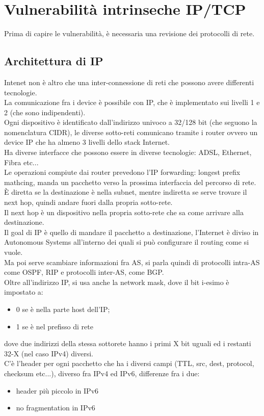 \documentclass[12pt, oneside]{extbook} %
\begin{document}
\chapter*{Vulnerabilità intrinseche IP/TCP}
Prima di capire le vulnerabilità, è necessaria una revisione dei protocolli di rete.
\section{Architettura di IP}
Intenet non è altro che una inter-connessione di reti che possono avere differenti tecnologie.
\\La comunicazione fra i device è possibile con IP, che è implementato sui livelli 1 e 2 (che sono indipendenti). 
\\Ogni dispositivo è identificato dall'indirizzo univoco a 32/128 bit (che seguono la nomenclatura CIDR), le diverse sotto-reti comunicano tramite i router ovvero un device IP che ha almeno 3 livelli dello stack Internet. 
\\Ha diverse interfacce che possono essere in diverse tecnologie: ADSL, Ethernet, Fibra etc...\\ Le operazioni compiute dai router prevedono l'IP forwarding: longest prefix mathcing, manda un pacchetto verso la prossima interfaccia del percorso di rete.
\\È diretta se la destinazione è nella subnet, mentre indiretta se serve trovare il next hop, quindi andare fuori dalla propria sotto-rete.
\\Il next hop è un dispositivo nella propria sotto-rete che sa come arrivare alla destinazione.
\\Il goal di IP è quello di mandare il pacchetto a destinazione, l'Internet è diviso in Autonomous Systems all'interno dei quali si può configurare il routing come si vuole.
\\Ma poi serve scambiare informazioni fra AS, si parla quindi di protocolli intra-AS come OSPF, RIP e protocolli inter-AS, come BGP.
\\Oltre all'indirizzo IP, si usa anche la network mask, dove il bit i-esimo è impostato a:
\begin{itemize}
    \item 0 se è nella parte host dell'IP;
    \item 1 se è nel prefisso di rete
\end{itemize}
dove due indirizzi della stessa sottorete hanno i primi X bit uguali ed i restanti 32-X (nel caso IPv4) diversi.
\\C'è l'header per ogni pacchetto che ha i diversi campi (TTL, src, dest, protocol, checksum etc...), diverso fra IPv4 ed IPv6, differenze fra i due:
\begin{itemize}
    \item header più piccolo in IPv6
    \item no fragmentation in IPv6
\end{itemize}
\end{document}
